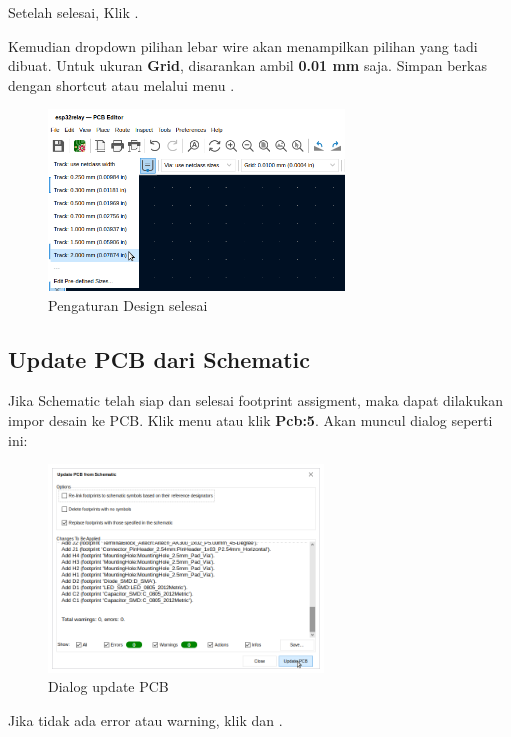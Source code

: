 \documentclass[12pt]{book}
\begin{document}
	Setelah selesai, Klik .

	\newpage
	Kemudian dropdown pilihan lebar wire akan menampilkan pilihan yang tadi dibuat.
	Untuk ukuran \textbf{Grid}, disarankan ambil \textbf{0.01 mm} saja.
	Simpan berkas dengan shortcut  atau melalui menu .

	\begin{figure}[!ht]
		\centering
		\includegraphics[width=0.7\textwidth]{images/pcb/pcb_set_3}
		\caption{Pengaturan Design selesai}
	\end{figure}

	\subsection{Update PCB dari Schematic}

	Jika Schematic telah siap dan selesai footprint assigment, maka dapat dilakukan impor desain ke PCB.
	Klik menu  atau klik \textbf{Pcb:5}.
	Akan muncul dialog seperti ini:

	\begin{figure}[!ht]
		\centering
		\includegraphics[width=0.65\textwidth]{images/pcb/pcb_2}
		\caption{Dialog update PCB}
	\end{figure}

	Jika tidak ada error atau warning, klik  dan .\\
\end{document}
